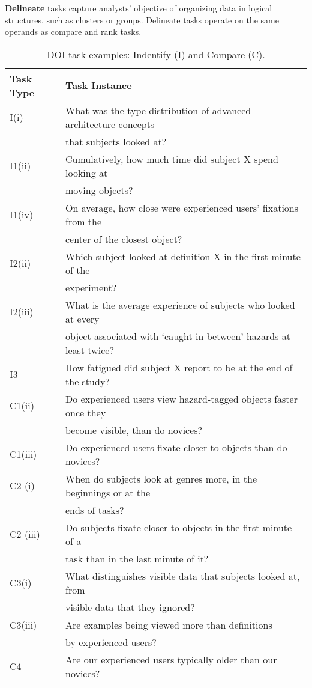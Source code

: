 \vspace{2mm}
\noindent\textbf{Delineate} tasks capture analysts' objective of organizing data in logical structures, such as clusters or groups. Delineate tasks operate on the same operands as compare and rank tasks. 

\begin{table}[htbp]	
\caption{DOI task examples: Indentify (I) and Compare (C).}
	\centering
    \begin{tabular}{|l|l|}
    \hline
    Task Type & Task Instance \\
    \hline
        I(i)& What was the type distribution of advanced architecture concepts\\& that subjects looked at?\\
    I1(ii) & Cumulatively, how much time did subject X spend looking at\\& moving objects?\\
    I1(iv) & On average, how close were experienced users' fixations from the\\& center of the closest object?\\
    I2(ii) & Which subject looked at definition X in the first minute of the\\& experiment?\\
    I2(iii) & What is the average experience of subjects who looked at every\\& object associated with `caught in between' hazards at least twice?\\
    I3 & How fatigued did subject X report to be at the end of the study?\\
    \hline
    C1(ii) & Do experienced users view hazard-tagged objects faster once they\\& become visible, than do novices?\\
C1(iii) & Do experienced users fixate closer to objects than do novices?\\
C2 (i) & When do subjects look at genres more, in the beginnings or at the\\& ends of tasks?\\
C2 (iii) & Do subjects fixate closer to objects in the first minute of a\\& task than in the last minute of it?\\
C3(i)& What distinguishes visible data that subjects looked at, from\\& visible data that they ignored?\\
C3(iii)& Are examples being viewed more than definitions\\& by experienced users?\\
C4 & Are our experienced users typically older than our novices?\\
    \hline
    \end{tabular} 
    
    \label{tab:Tasks1}
		\end{table}

